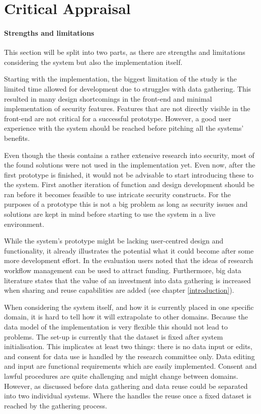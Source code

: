 \section{Critical Appraisal}

\paragraph{Strengths and limitations}
This section will be split into two parts, as there are strengths and limitations considering the system but also the implementation itself.

Starting with the implementation, the biggest limitation of the study is the limited time allowed for development due to struggles with data gathering.
This resulted in many design shortcomings in the front-end and minimal implementation of security features.
Features that are not directly visible in the front-end are not critical for a successful prototype.
However, a good user experience with the system should be reached before pitching all the systems' benefits.

Even though the thesis contains a rather extensive research into security, most of the found solutions were not used in the \ivfsystem{} implementation yet.
Even now, after the first prototype is finished, it would not be advisable to start introducing these to the system.
First another iteration of function and design development should be ran before it becomes feasible to use intricate security constructs.
For the purposes of a prototype this is not a big problem as long as security issues and solutions are kept in mind before starting to use the system in a live environment.

While the system's prototype might be lacking user-centred design and functionality, it already illustrates the potential what it could become after some more development effort.
In the evaluation users noted that the ideas of research workflow management can be used to attract funding.
Furthermore, big data literature states that the value of an investment into data gathering is increased when sharing and reuse capabilities are added (see chapter \ref{introduction}).

When considering the system itself, and how it is currently placed in one specific domain, it is hard to tell how it will extrapolate to other domains.
Because the data model of the implementation is very flexible this should not lead to problems.
The set-up is currently that the dataset is fixed after system initialisation.
This implicates at least two things: there is no data input or edits, and consent for data use is handled by the research committee only.
Data editing and input are functional requirements which are easily implemented.
Consent and lawful procedures are quite  challenging and might change between domains.
However, as discussed before data gathering and data reuse could be separated into two individual systems.
Where the \ivfsystem{} handles the reuse once a fixed dataset is reached by the gathering process.

